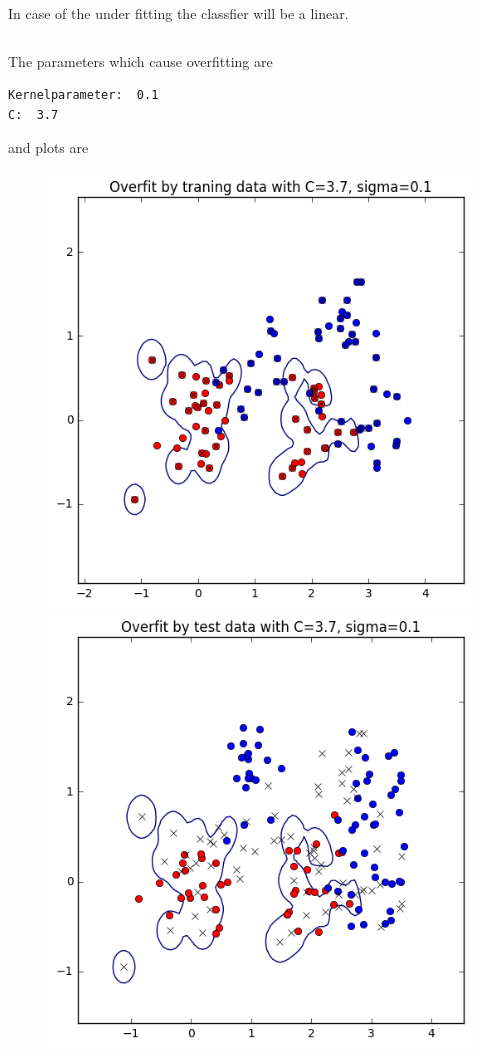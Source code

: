 \documentclass[a4paper,11pt]{article}
\begin{document}
In case of the under fitting the classfier will be a linear.

\begin{verbatim}

\end{verbatim}

The parameters which cause overfitting are

\begin{verbatim}
Kernelparameter:  0.1
C:  3.7
\end{verbatim}

and plots are

\begin{figure}[htbp]
  \includegraphics[scale=0.5]{smooftr.png}
  \includegraphics[scale=0.5]{smoofte.png}
\end{figure}
\end{document}
